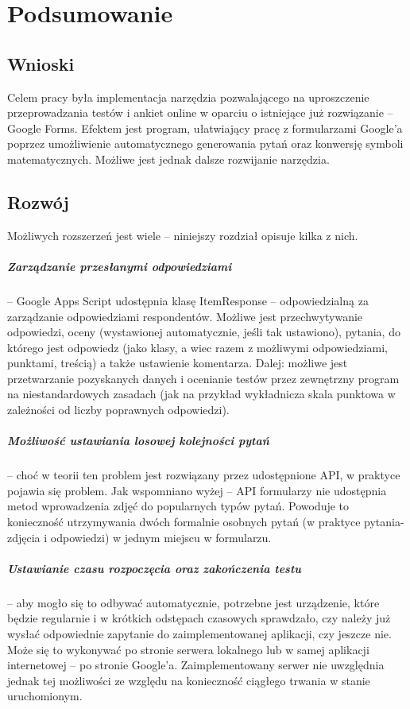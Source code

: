 \chapter{Podsumowanie}%

\section{Wnioski}
Celem pracy była implementacja narzędzia pozwalającego na uproszczenie przeprowadzania testów i ankiet online w oparciu o istniejące już rozwiązanie -- Google Forms.  Efektem jest program, ułatwiający pracę z formularzami Google'a poprzez umożliwienie automatycznego generowania pytań oraz konwersję symboli matematycznych.  Możliwe jest jednak dalsze rozwijanie narzędzia. 

\section{Rozwój}
Możliwych rozszerzeń jest wiele -- niniejszy rozdział opisuje kilka z nich.
\paragraph{Zarządzanie przesłanymi odpowiedziami} -- Google Apps Script udostępnia klasę ItemResponse -- odpowiedzialną za zarządzanie odpowiedziami respondentów. Możliwe jest przechwytywanie odpowiedzi, oceny (wystawionej automatycznie, jeśli tak ustawiono), pytania, do którego jest odpowiedz (jako klasy, a wiec razem z możliwymi odpowiedziami, punktami, treścią) a także ustawienie komentarza. Dalej: możliwe jest przetwarzanie pozyskanych danych i ocenianie testów przez zewnętrzny program na niestandardowych zasadach (jak na przykład wykładnicza skala punktowa w zależności od liczby poprawnych odpowiedzi).
\paragraph{Możliwość ustawiania losowej kolejności pytań} -- choć w teorii ten problem jest rozwiązany przez udostępnione API, w praktyce pojawia się problem. Jak wspomniano wyżej -- API formularzy nie udostępnia metod wprowadzenia zdjęć do popularnych typów pytań. Powoduje to konieczność utrzymywania dwóch formalnie osobnych pytań (w praktyce pytania-zdjęcia i odpowiedzi) w jednym miejscu w formularzu.
\paragraph{Ustawianie czasu rozpoczęcia oraz zakończenia testu} -- aby mogło się to odbywać automatycznie, potrzebne jest urządzenie, które będzie regularnie i w krótkich odstępach czasowych sprawdzało, czy należy już wysłać odpowiednie zapytanie do zaimplementowanej aplikacji, czy jeszcze nie. Może się to wykonywać po stronie serwera lokalnego lub w samej aplikacji internetowej -- po stronie Google'a. Zaimplementowany serwer nie uwzględnia jednak tej możliwości ze względu na konieczność ciągłego trwania w stanie uruchomionym. 


